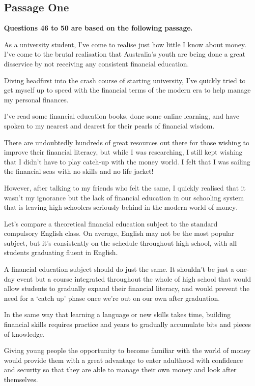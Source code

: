 \documentclass[UTF8,11pt]{ctexart}
\begin{document}
\subsection*{\textbf{Passage One}}


\textbf{Questions 46 to 50 are based on the following passage.}


As a university student, I’ve come to realise just how little I know about money. I’ve come to the brutal realisation that Australia’s youth are being done a great disservice by not receiving any consistent financial education.


Diving headfirst into the crash course of starting university, I’ve quickly tried to get myself up to speed with the financial terms of the modern era to help manage my personal finances.


I’ve read some financial education books, done some online learning, and have spoken to my nearest and dearest for their pearls of financial wisdom.


There are undoubtedly hundreds of great resources out there for those wishing to improve their financial literacy, but while I was researching, I still kept wishing that I didn’t have to play catch-up with the money world. I felt that I was sailing the financial seas with no skills and no life jacket!


However, after talking to my friends who felt the same, I quickly realised that it wasn’t my ignorance but the lack of financial education in our schooling system that is leaving high schoolers seriously behind in the modern world of money.


Let’s compare a theoretical financial education subject to the standard compulsory English class. On average, English may not be the most popular subject, but it’s consistently on the schedule throughout high school, with all students graduating fluent in English.


A financial education subject should do just the same. It shouldn’t be just a one-day event but a course integrated throughout the whole of high school that would allow students to gradually expand their financial literacy, and would prevent the need for a ‘catch up’ phase once we’re out on our own after graduation.


In the same way that learning a language or new skills takes time, building financial skills requires practice and years to gradually accumulate bits and pieces of knowledge.


Giving young people the opportunity to become familiar with the world of money would provide them with a great advantage to enter adulthood with confidence and security so that they are able to manage their own money and look after themselves.
\end{document}
